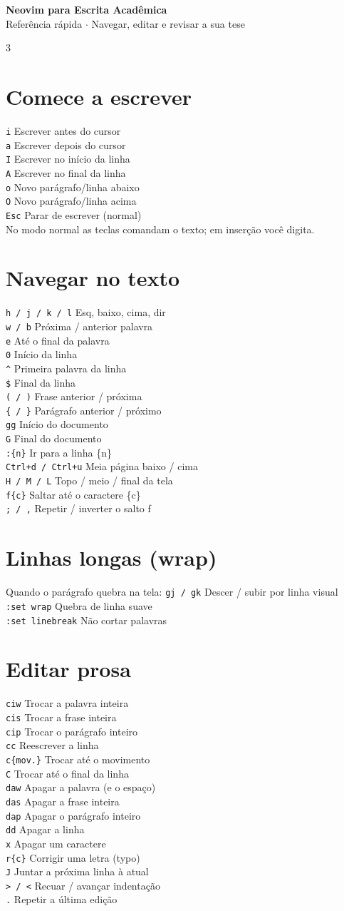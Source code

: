 \documentclass[10pt,a4paper]{article}
\newcommand{\key}[1]{{\small\texttt{#1}}}
\newcommand{\desc}[1]{{\small #1}}
\newcommand{\K}[2]{\key{#1} \hfill \desc{#2}\\[1.5pt]}
\begin{document}
\begin{center}
{\LARGE\bfseries\color{darktext} Neovim para Escrita Acad\^emica}\\[3pt]
{\small\color{gray} Refer\^encia r\'apida $\cdot$ Navegar, editar e revisar a sua tese}
\end{center}

\vspace{4pt}

\begin{multicols}{3}
\raggedcolumns

\section{Comece a escrever}
\K{i}{Escrever antes do cursor}
\K{a}{Escrever depois do cursor}
\K{I}{Escrever no in\'icio da linha}
\K{A}{Escrever no final da linha}
\K{o}{Novo par\'agrafo/linha abaixo}
\K{O}{Novo par\'agrafo/linha acima}
\K{Esc}{Parar de escrever (normal)}
\desc{No modo normal as teclas comandam o texto; em inser\c{c}\~ao voc\^e digita.}

\section{Navegar no texto}
\K{h / j / k / l}{Esq, baixo, cima, dir}
\K{w / b}{Pr\'oxima / anterior palavra}
\K{e}{At\'e o final da palavra}
\K{0}{In\'icio da linha}
\K{\^{}}{Primeira palavra da linha}
\K{\$}{Final da linha}
\K{( / )}{Frase anterior / pr\'oxima}
\K{\{ / \}}{Par\'agrafo anterior / pr\'oximo}
\K{gg}{In\'icio do documento}
\K{G}{Final do documento}
\K{:\{n\}}{Ir para a linha \{n\}}
\K{Ctrl+d / Ctrl+u}{Meia p\'agina baixo / cima}
\K{H / M / L}{Topo / meio / final da tela}
\K{f\{c\}}{Saltar at\'e o caractere \{c\}}
\K{; / ,}{Repetir / inverter o salto f}

\section{Linhas longas (wrap)}
\desc{Quando o par\'agrafo quebra na tela:}
\vspace{3pt}
\K{gj / gk}{Descer / subir por linha visual}
\K{:set wrap}{Quebra de linha suave}
\K{:set linebreak}{N\~ao cortar palavras}

\section{Editar prosa}
\K{ciw}{Trocar a palavra inteira}
\K{cis}{Trocar a frase inteira}
\K{cip}{Trocar o par\'agrafo inteiro}
\K{cc}{Reescrever a linha}
\K{c\{mov.\}}{Trocar at\'e o movimento}
\K{C}{Trocar at\'e o final da linha}
\K{daw}{Apagar a palavra (e o espa\c{c}o)}
\K{das}{Apagar a frase inteira}
\K{dap}{Apagar o par\'agrafo inteiro}
\K{dd}{Apagar a linha}
\K{x}{Apagar um caractere}
\K{r\{c\}}{Corrigir uma letra (typo)}
\K{J}{Juntar a pr\'oxima linha \`a atual}
\K{> / <}{Recuar / avan\c{c}ar indenta\c{c}\~ao}
\K{.}{Repetir a \'ultima edi\c{c}\~ao}


\end{multicols}
\end{document}
